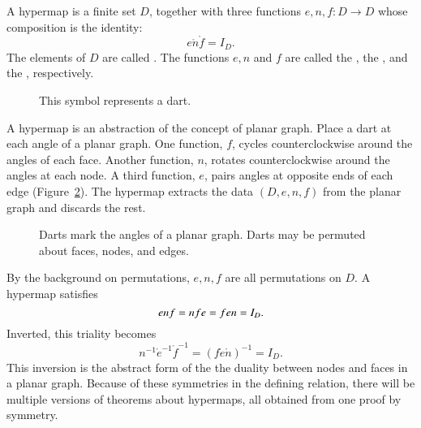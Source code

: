 \begin{definition}\label{def:hypermap}  
  A hypermap is a finite set $D$, together with three functions
  $e,n,f:D\to D$ whose composition is the identity:
  \begin{displaymath}
e\ocirc n\ocirc f = I_D.
\end{displaymath} The
elements of $D$ are called .  The functions $e,n$ and
$f$ are called the , the , and
the , respectively.  %
%
%
%
%
%
%
%
%
\end{definition}

\begin{figure}[htb]
\centering
{}
\caption{This symbol represents a dart.}
\label{fig:dart}
\end{figure}

\begin{remark} A hypermap is an abstraction of
the concept of 
planar graph.  Place a dart at each angle of a planar graph.
One function, $f$, 
cycles counterclockwise around the angles of each face.  
Another function, $n$, 
rotates counterclockwise around the angles at each
node.  A third function, $e$, pairs angles at opposite ends of
each edge  (Figure~\ref{fig:hypermap_ex}).   The hypermap extracts
the data $(D,e,n,f)$ from the planar graph and discards the rest.
%
\end{remark}

\begin{figure}[htb]
\centering
{}
\caption{Darts mark the angles of a planar graph.  Darts may
be permuted about faces, nodes, and edges.}
\label{fig:hypermap_ex}
\end{figure}

By the background on permutations, $e,n,f$ are all permutations on $D$.
A hypermap satisfies 
\begin{equation}\tlabel{eqn:triality}
e \ocirc n\ocirc f = n\ocirc f\ocirc e = f\ocirc e\ocirc n = I_D.
\end{equation}
Inverted, this triality becomes
\begin{displaymath}
n^{-1} \ocirc e^{-1} \ocirc f^{-1} = (f \ocirc e \ocirc n)^{-1} = I_D.
\end{displaymath}
This inversion is the abstract form of the the duality between nodes
and faces in a planar graph.  Because of these symmetries in the
defining relation, there will be multiple versions of theorems about
hypermaps, all obtained from one proof by symmetry.


